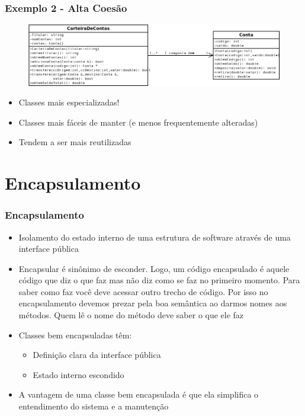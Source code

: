 \documentclass[aspectratio=169]{beamer}
\begin{document}
\begin{frame}\frametitle{Exemplo 2 - Alta Coesão}
\begin{figure}[h]
	\centering
	\includegraphics[height=0.3\paperheight]{imagens/carteira_contas.png}
\end{figure}
\begin{itemize}
	\item Classes mais especializadas!
	\item Classes mais fáceis de manter (e menos frequentemente alteradas)
	\item Tendem a ser mais reutilizadas
\end{itemize}
\end{frame}

\section{Encapsulamento}

\begin{frame}\frametitle{Encapsulamento}
\begin{itemize}
	\item Isolamento do estado interno de uma estrutura de software através de uma interface pública
	\item Encapsular é sinônimo de esconder. Logo, um código encapsulado é aquele código que diz o que faz mas não diz como se faz no primeiro momento. Para saber como faz você deve acessar outro trecho de código. Por isso no encapsulamento devemos prezar pela boa semântica ao darmos nomes aos métodos. Quem lê o nome do método deve saber o que ele faz
	\item Classes bem encapsuladas têm:
	\begin{itemize}
		\item Definição clara da interface pública
		\item Estado interno escondido
	\end{itemize}
	\item A vantagem de uma classe bem encapsulada é que ela simplifica o entendimento do sistema e a manutenção
\end{itemize}
\end{frame}
\end{document}
